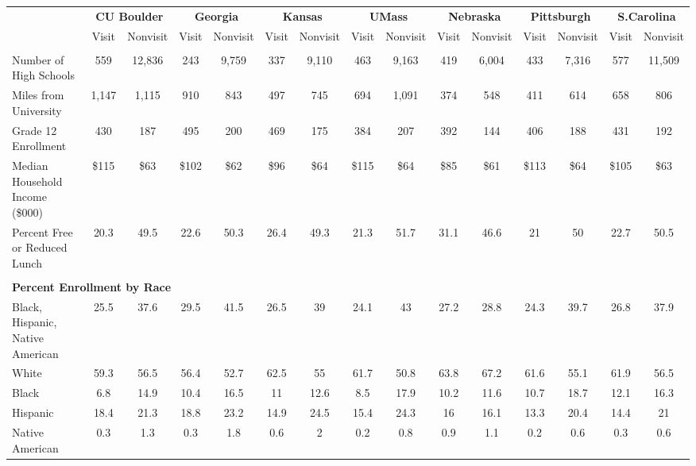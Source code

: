 \begin{tabular*}{0.95\textwidth}{@{\extracolsep{\fill} } lcccccccccccccc}%
&\multicolumn{2}{c}{\bfseries CU Boulder}&\multicolumn{2}{c}{\bfseries Georgia}&\multicolumn{2}{c}{\bfseries Kansas}&\multicolumn{2}{c}{\bfseries UMass}&\multicolumn{2}{c}{\bfseries Nebraska}&\multicolumn{2}{c}{\bfseries Pittsburgh}&\multicolumn{2}{c}{\bfseries S.Carolina}\\%
&Visit&\multicolumn{1}{l}{Nonvisit}&Visit&\multicolumn{1}{l}{Nonvisit}&Visit&\multicolumn{1}{l}{Nonvisit}&Visit&\multicolumn{1}{l}{Nonvisit}&Visit&\multicolumn{1}{l}{Nonvisit}&Visit&\multicolumn{1}{l}{Nonvisit}&Visit&\multicolumn{1}{l}{Nonvisit}\\%
\hline%
&&&&&&&&&&&&&&\\%
\hspace{0cm}Number of High Schools&559&12,836&243&9,759&337&9,110&463&9,163&419&6,004&433&7,316&577&11,509\\%
\hspace{0cm}Miles from University&1,147&1,115&910&843&497&745&694&1,091&374&548&411&614&658&806\\%
\hspace{0cm}Grade 12 Enrollment&430&187&495&200&469&175&384&207&392&144&406&188&431&192\\%
\hspace{0cm}Median Household Income (\$000)&\$115&\$63&\$102&\$62&\$96&\$64&\$115&\$64&\$85&\$61&\$113&\$64&\$105&\$63\\%
\hspace{0cm}Percent Free or Reduced Lunch&20.3&49.5&22.6&50.3&26.4&49.3&21.3&51.7&31.1&46.6&21&50&22.7&50.5\\%
&&&&&&&&&&&&&&\\%
\multicolumn{15}{l}{\bfseries Percent Enrollment by Race}\\%
\hspace{0.2cm}Black, Hispanic, Native American&25.5&37.6&29.5&41.5&26.5&39&24.1&43&27.2&28.8&24.3&39.7&26.8&37.9\\%
\hspace{0.2cm}White&59.3&56.5&56.4&52.7&62.5&55&61.7&50.8&63.8&67.2&61.6&55.1&61.9&56.5\\%
\hspace{0.2cm}Black&6.8&14.9&10.4&16.5&11&12.6&8.5&17.9&10.2&11.6&10.7&18.7&12.1&16.3\\%
\hspace{0.2cm}Hispanic&18.4&21.3&18.8&23.2&14.9&24.5&15.4&24.3&16&16.1&13.3&20.4&14.4&21\\%
\hspace{0.2cm}Native American&0.3&1.3&0.3&1.8&0.6&2&0.2&0.8&0.9&1.1&0.2&0.6&0.3&0.6\\%

\end{tabular*}
